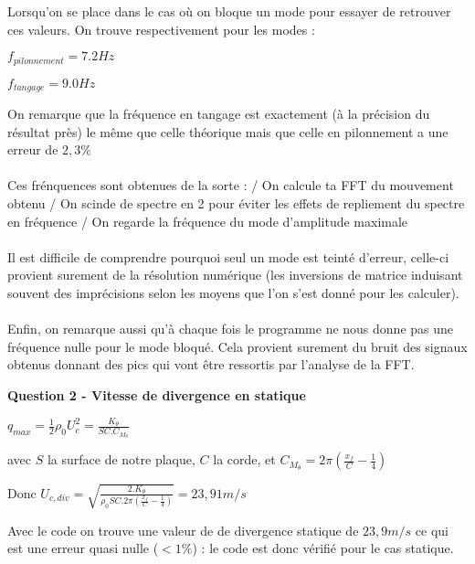 \documentclass[conference]{IEEEtran}
\begin{document}
Lorsqu'on se place dans le cas où on bloque un mode pour essayer de retrouver ces valeurs. On trouve respectivement pour les modes : 

\begin{center}
    $f_{pilonnement} = 7.2 Hz$
\end{center}
\begin{center}
    $f_{tangage} = 9.0 Hz$
\end{center}

On remarque que la fréquence en tangage est exactement (à la précision du résultat près) le même que celle théorique mais que celle en pilonnement a une erreur de $2,3\%$
\\ \\
Ces frénquences sont obtenues de la sorte :
/ On calcule ta FFT du mouvement obtenu 
/ On scinde de spectre en 2 pour éviter les effets de repliement du spectre en fréquence
/ On regarde la fréquence du mode d'amplitude maximale
\\ \\
Il est difficile de comprendre pourquoi seul un mode est teinté d'erreur, celle-ci provient surement de la résolution numérique (les inversions de matrice induisant souvent des imprécisions selon les moyens que l'on s'est donné pour les calculer). 
\\ \\
Enfin, on remarque aussi qu'à chaque fois le programme ne nous donne pas une fréquence nulle pour le mode bloqué. Cela provient surement du bruit des signaux obtenus donnant des pics qui vont être ressortis par l'analyse de la FFT. 

\pagebreak

\textbf{Question 2 - Vitesse de divergence en statique } 

\begin{center}
    $q_{max} = \frac{1}{2}\rho_0 U_c^2 = \frac{K_\theta}{SC.C_{M_\theta}}$
\end{center}
 avec $S$ la surface de notre plaque, $C$ la corde, et $C_{M_\theta} = 2\pi (\frac{x_f}{C} - \frac{1}{4})$

\hfill

Donc $U_{c,div} = \sqrt{\frac{2.K_\theta}{\rho_0SC.2\pi(\frac{x_f}{C} - \frac{1}{4})}} = 23,91 m/s $

Avec le code on trouve une valeur de de divergence statique de $23,9 m/s$ ce qui est une erreur quasi nulle ($<1\%$) : le code est donc vérifié pour le cas statique. 
\end{document}
